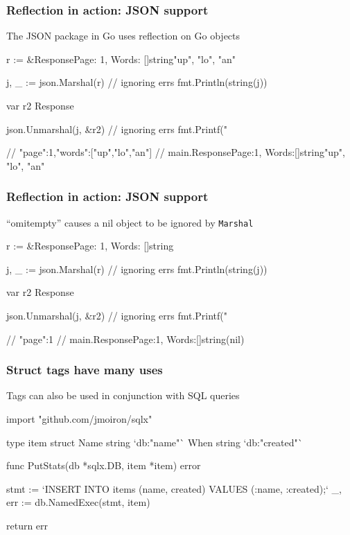 \documentclass[handout,compress,t,11pt]{beamer}
\begin{document}
\begin{frame}[fragile]
    \frametitle{Reflection in action: JSON support}
    The JSON package in Go uses reflection on Go objects
    \vspace{0.4\baselineskip}
\begin{golang}
r := &Response{Page: 1, Words: []string{"up", "lo", "an"}}

j, _ := json.Marshal(r)              // ignoring errs
fmt.Println(string(j))

var r2 Response

json.Unmarshal(j, &r2)               // ignoring errs
fmt.Printf("%

// {"page":1,"words":["up","lo","an"]}
// main.Response{Page:1, Words:[]string{"up", "lo", "an"}}
\end{golang}
\end{frame}

\begin{frame}[fragile]
    \frametitle{Reflection in action: JSON support}
    ``omitempty'' causes a nil object to be ignored by \verb|Marshal|
    \vspace{0.4\baselineskip}
\begin{golang}
r := &Response{Page: 1, Words: []string{}}

j, _ := json.Marshal(r)              // ignoring errs
fmt.Println(string(j))

var r2 Response

json.Unmarshal(j, &r2)               // ignoring errs
fmt.Printf("%

// {"page":1}
// main.Response{Page:1, Words:[]string(nil)}
\end{golang}
\end{frame}

\begin{frame}[fragile]
    \frametitle{Struct tags have many uses}
    Tags can also be used in conjunction with SQL queries
    \vspace{0.4\baselineskip}
\begin{golang}
import "github.com/jmoiron/sqlx"

type item struct {
	Name string `db:"name"`
	When string `db:"created"`
}

func PutStats(db *sqlx.DB, item *item) error {
	stmt := `INSERT INTO items (name, created) 
             VALUES (:name, :created);`
	_, err := db.NamedExec(stmt, item)

	return err
}
\end{golang}
\end{frame}
\end{document}
